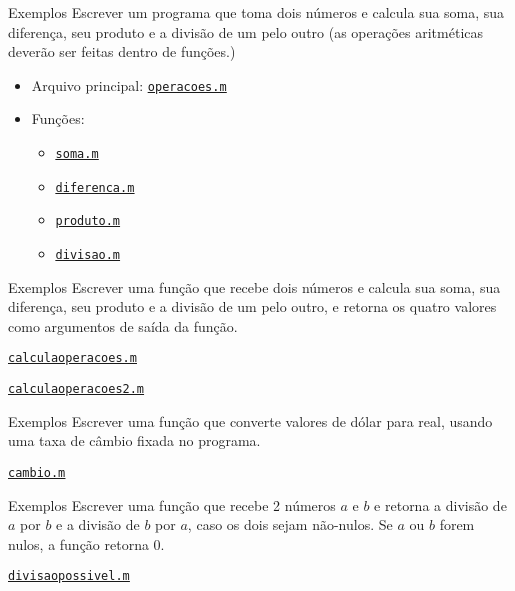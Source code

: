 \documentclass[hyperref={pdfpagelabels=false}]{beamer}
\begin{document}
\begin{frame}{Exemplos}
   Escrever um programa que toma dois números e calcula sua soma, sua diferença, seu produto e a divisão de um pelo outro (as operações aritméticas deverão ser feitas dentro de funções.)

   \begin{itemize}
   \item Arquivo principal: \href{listings/operacoes.m}{\underline{\texttt{operacoes.m}}}
   \item Funções:
     \begin{itemize}
     \item \href{listings/soma.m}{\underline{\texttt{soma.m}}}
     \item \href{listings/diferenca.m}{\underline{\texttt{diferenca.m}}}
	   \item \href{listings/produto.m}{\underline{\texttt{produto.m}}}
	   \item \href{listings/divisao.m}{\underline{\texttt{divisao.m}}}
     \end{itemize}
   \end{itemize}
\end{frame}

\begin{frame}{Exemplos}
	Escrever uma função que recebe dois números e calcula sua soma, sua diferença, seu produto e a divisão de um pelo outro, e retorna os quatro valores como argumentos de saída da função.
  
	\begin{center} \href{listings/calculaoperacoes.m}{\underline{\texttt{calculaoperacoes.m}}} \end{center}
	\begin{center} \href{listings/calculaoperacoes2.m}{\underline{\texttt{calculaoperacoes2.m}}} \end{center}

\end{frame}

\begin{frame}{Exemplos}
  Escrever uma função que converte valores de dólar para real, usando uma taxa de câmbio fixada no programa.
	\begin{center} \href{listings/cambio.m}{\underline{\texttt{cambio.m}}} \end{center}
\end{frame}

\begin{frame}{Exemplos}
  Escrever uma função que recebe 2 números $a$ e $b$ e retorna a divisão de $a$ por $b$ e a divisão de $b$ por $a$, caso os dois sejam não-nulos. Se $a$ ou $b$ forem nulos, a função retorna 0.
   
   \begin{center} \href{listings/divisaopossivel.m}{\underline{\texttt{divisaopossivel.m}}} \end{center}
\end{frame}
\end{document}
